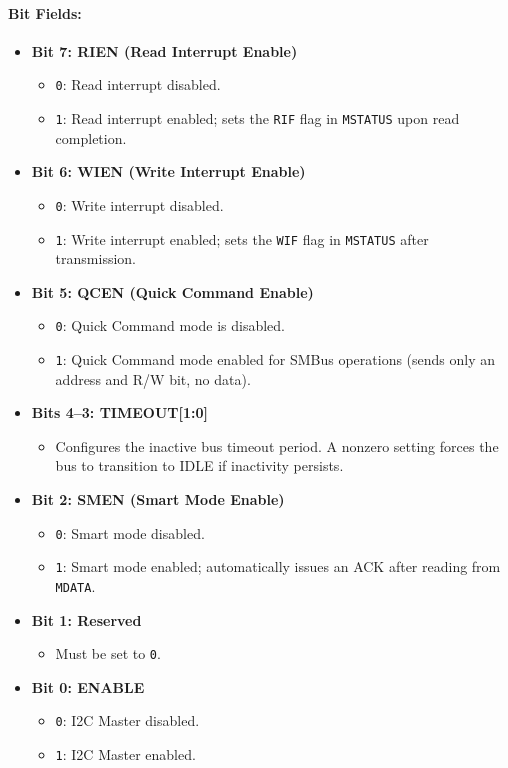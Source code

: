 \paragraph{Bit Fields:}
\begin{itemize}[leftmargin=*,itemsep=2mm]
  \item \textbf{Bit 7: RIEN (Read Interrupt Enable)}  
        \begin{itemize}
          \item \texttt{0}: Read interrupt disabled.
          \item \texttt{1}: Read interrupt enabled; sets the \texttt{RIF} flag in \texttt{MSTATUS} upon read completion.
        \end{itemize}
  \item \textbf{Bit 6: WIEN (Write Interrupt Enable)}  
        \begin{itemize}
          \item \texttt{0}: Write interrupt disabled.
          \item \texttt{1}: Write interrupt enabled; sets the \texttt{WIF} flag in \texttt{MSTATUS} after transmission.
        \end{itemize}
  \item \textbf{Bit 5: QCEN (Quick Command Enable)}  
        \begin{itemize}
          \item \texttt{0}: Quick Command mode is disabled.
          \item \texttt{1}: Quick Command mode enabled for SMBus operations (sends only an address and R/W bit, no data).
        \end{itemize}
  \item \textbf{Bits 4--3: TIMEOUT[1:0]}  
        \begin{itemize}
          \item Configures the inactive bus timeout period. A nonzero setting forces the bus to transition to IDLE
                if inactivity persists.
        \end{itemize}
  \item \textbf{Bit 2: SMEN (Smart Mode Enable)}  
        \begin{itemize}
          \item \texttt{0}: Smart mode disabled.
          \item \texttt{1}: Smart mode enabled; automatically issues an ACK after reading from \texttt{MDATA}.
        \end{itemize}
  \item \textbf{Bit 1: Reserved}  
        \begin{itemize}
          \item Must be set to \texttt{0}.
        \end{itemize}
  \item \textbf{Bit 0: ENABLE}  
        \begin{itemize}
          \item \texttt{0}: I2C Master disabled.
          \item \texttt{1}: I2C Master enabled.
        \end{itemize}
\end{itemize}

